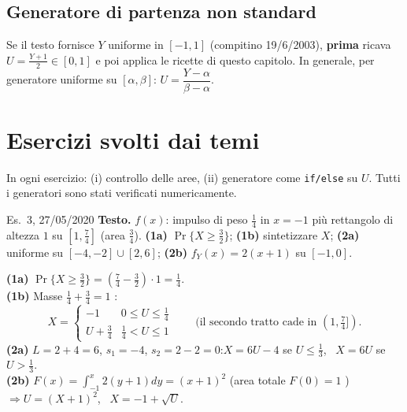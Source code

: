 \subsection{Generatore di partenza non standard}
Se il testo fornisce $Y$ uniforme in $[-1,1]$ (compitino 19/6/2003), \textbf{prima} ricava $U=\tfrac{Y+1}{2}\in[0,1]$ e poi applica le ricette di questo capitolo. In generale, per generatore uniforme su $[\alpha,\beta]$: $U=\dfrac{Y-\alpha}{\beta-\alpha}$.

\section{Esercizi svolti dai temi}\label{cap4-esercizi}

In ogni esercizio: (i) controllo delle aree, (ii) generatore come \texttt{if/else} su $U$. Tutti i generatori sono stati verificati numericamente.\mio

\begin{esempio}{Es.~3, 27/05/2020}
\textbf{Testo.} $f(x)$: impulso di peso $\tfrac14$ in $x=-1$ più rettangolo di altezza $1$ su $[1,\tfrac74]$ (area $\tfrac34$). \textbf{(1a)} $\Pr\{X\ge\tfrac32\}$; \textbf{(1b)} sintetizzare $X$; \textbf{(2a)} uniforme su $[-4,-2]\cup[2,6]$; \textbf{(2b)} $f_Y(x)=2(x+1)$ su $[-1,0]$.

\textbf{(1a)} $\Pr\{X\ge\tfrac32\}=(\tfrac74-\tfrac32)\cdot1=\tfrac14$.\\
\textbf{(1b)} Masse $\tfrac14+\tfrac34=1$ \checkmark:
\[
X=\begin{cases}-1&0\le U\le\tfrac14\\ U+\tfrac34&\tfrac14<U\le1\end{cases}\qquad(\text{il secondo tratto cade in }(1,\tfrac74]).
\]
\textbf{(2a)} $L=2+4=6$, $s_1=-4$, $s_2=2-2=0$:\quad $X=6U-4$ se $U\le\tfrac13$, \ $X=6U$ se $U>\tfrac13$.\\
\textbf{(2b)} $F(x)=\int_{-1}^x2(y+1)dy=(x+1)^2$ (area totale $F(0)=1$ \checkmark) $\Rightarrow U=(X+1)^2$, \ $X=-1+\sqrt U$.
\end{esempio}

